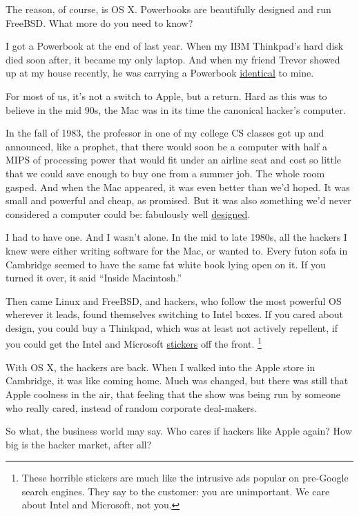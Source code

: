 \documentclass[12pt]{book}
\begin{document}
The reason, of course, is OS X. Powerbooks are beautifully designed and
run FreeBSD. What more do you need to know?

I got a Powerbook at the end of last year. When my IBM Thinkpad's hard
disk died soon after, it became my only laptop. And when my friend
Trevor showed up at my house recently, he was carrying a Powerbook
\href{tlbmac.html}{identical} to mine.

For most of us, it's not a switch to Apple, but a return. Hard as this
was to believe in the mid 90s, the Mac was in its time the canonical
hacker's computer.

In the fall of 1983, the professor in one of my college CS classes got
up and announced, like a prophet, that there would soon be a computer
with half a MIPS of processing power that would fit under an airline
seat and cost so little that we could save enough to buy one from a
summer job. The whole room gasped. And when the Mac appeared, it was
even better than we'd hoped. It was small and powerful and cheap, as
promised. But it was also something we'd never considered a computer
could be: fabulously well \href{taste.html}{designed}.

I had to have one. And I wasn't alone. In the mid to late 1980s, all the
hackers I knew were either writing software for the Mac, or wanted to.
Every futon sofa in Cambridge seemed to have the same fat white book
lying open on it. If you turned it over, it said ``Inside Macintosh.''

Then came Linux and FreeBSD, and hackers, who follow the most powerful
OS wherever it leads, found themselves switching to Intel boxes. If you
cared about design, you could buy a Thinkpad, which was at least not
actively repellent, if you could get the Intel and Microsoft
\href{designedforwindows.html}{stickers} off the front. \footnote{These horrible stickers are much like the intrusive ads popular
on pre-Google search engines. They say to the customer: you are
unimportant. We care about Intel and Microsoft, not you.}

With OS X, the hackers are back. When I walked into the Apple store in
Cambridge, it was like coming home. Much was changed, but there was
still that Apple coolness in the air, that feeling that the show was
being run by someone who really cared, instead of random corporate
deal-makers.

So what, the business world may say. Who cares if hackers like Apple
again? How big is the hacker market, after all?
\end{document}
